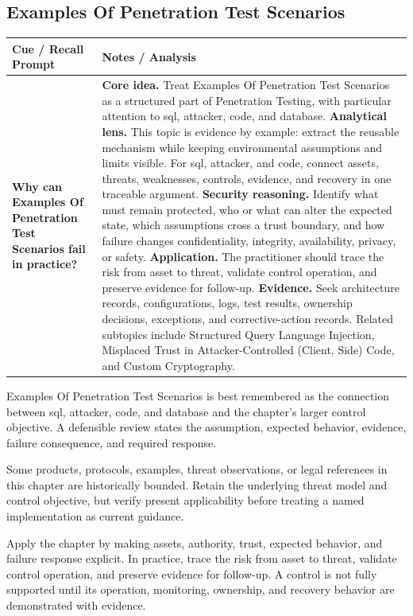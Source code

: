 \documentclass[11pt]{article}
\newcommand{\CornellHeader}{%
\rowcolor{Navy}\color{white}\bfseries Cue / Recall Prompt & \color{white}\bfseries Notes / Analysis\\\hline}
\newcommand{\CornellRow}[2]{%
\cellcolor{CueGray}\RaggedRight\textbf{#1} & \RaggedRight #2\\\hline}
\begin{document}
\subsection*{Examples Of Penetration Test Scenarios}
\begin{longtable}{>{\RaggedRight\arraybackslash}p{}|>{\RaggedRight\arraybackslash}p{}}
\CornellHeader
\CornellRow{Why can Examples Of Penetration Test Scenarios fail in practice?}{\textbf{Core idea.} Treat Examples Of Penetration Test Scenarios as a structured part of Penetration Testing, with particular attention to sql, attacker, code, and database. \textbf{Analytical lens.} This topic is evidence by example: extract the reusable mechanism while keeping environmental assumptions and limits visible. For sql, attacker, and code, connect assets, threats, weaknesses, controls, evidence, and recovery in one traceable argument. \textbf{Security reasoning.} Identify what must remain protected, who or what can alter the expected state, which assumptions cross a trust boundary, and how failure changes confidentiality, integrity, availability, privacy, or safety. \textbf{Application.} The practitioner should trace the risk from asset to threat, validate control operation, and preserve evidence for follow-up. \textbf{Evidence.} Seek architecture records, configurations, logs, test results, ownership decisions, exceptions, and corrective-action records. Related subtopics include Structured Query Language Injection, Misplaced Trust in Attacker-Controlled (Client, Side) Code, and Custom Cryptography.}
\end{longtable}
\begin{topicsummary}
Examples Of Penetration Test Scenarios is best remembered as the connection between sql, attacker, code, and database and the chapter's larger control objective. A defensible review states the assumption, expected behavior, evidence, failure consequence, and required response.
\end{topicsummary}
\begin{historybox}
Some products, protocols, examples, threat observations, or legal references in this chapter are historically bounded. Retain the underlying threat model and control objective, but verify present applicability before treating a named implementation as current guidance.
\end{historybox}
\begin{defensebox}
Apply the chapter by making assets, authority, trust, expected behavior, and failure response explicit. In practice, trace the risk from asset to threat, validate control operation, and preserve evidence for follow-up. A control is not fully supported until its operation, monitoring, ownership, and recovery behavior are demonstrated with evidence.
\end{defensebox}
\end{document}

